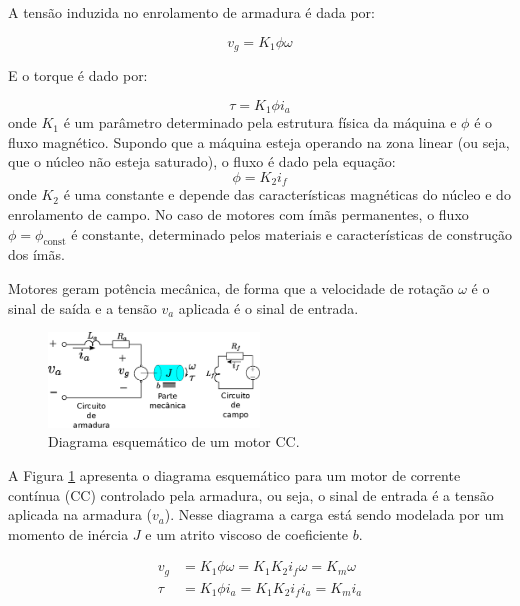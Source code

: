 A tensão induzida no enrolamento de armadura é dada por:

\begin{equation}
    v_g = K_{1}\phi\omega
\end{equation}

E o torque é dado por:

\begin{equation}
    \tau = K_{1} \phi i_a 
\end{equation}onde $K_1$ é um parâmetro determinado pela estrutura física da máquina e $\phi$ é o fluxo magnético. Supondo que a máquina esteja operando na zona linear (ou seja, que o núcleo não esteja saturado), o fluxo é dado pela equação:
\begin{equation}
    \phi = K_{2}i_f
\end{equation}onde $K_2$ é uma constante e depende das características magnéticas do núcleo e do enrolamento de campo. No caso de motores com ímãs permanentes, o fluxo $\phi = \phi_\text{const}$ é constante, determinado pelos materiais e características de construção dos ímãs.

Motores geram potência mecânica, de forma que a velocidade de rotação $\omega$ é o sinal de saída e a tensão $v_a$ aplicada é o sinal de entrada. 

\begin{figure}[H]
    \centering
    \includegraphics[width=0.5\textwidth]{figuras/ilustracoes/esquematico_motor_dc.eps}
    \caption{Diagrama esquemático de um motor CC.}
    \label{fig:modelo_motor_dc}
\end{figure}


A Figura \ref{fig:modelo_motor_dc} apresenta o diagrama esquemático para um motor de corrente contínua (CC) controlado pela armadura, ou seja, o sinal de entrada é a tensão aplicada na armadura ($v_a$). Nesse diagrama a carga está sendo modelada por um momento de inércia $J$ e um atrito viscoso de coeficiente $b$.

\begin{align*}
    v_g &= K_{1}\phi\omega= K_{1}K_{2}i_{f}\omega = K_{m}\omega\\
    \tau &= K_{1} \phi i_{a}= K_{1} K_{2}i_{f} i_{a} = K_{m}i_{a}
\end{align*}

